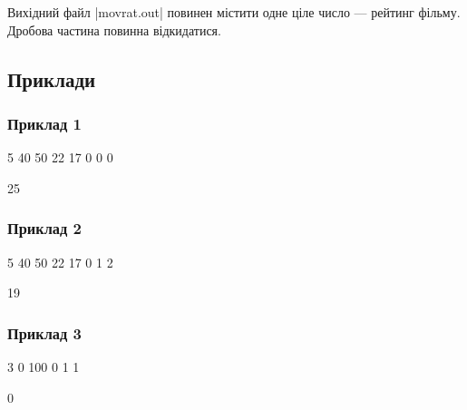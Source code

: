 \documentclass[12pt,a4paper]{article}
\begin{document}
Вихідний файл |movrat.out| повинен містити одне ціле число --- рейтинг фільму. Дробова частина повинна відкидатися.


\pagebreak


\subsection*{Приклади}

\subsubsection*{Приклад 1}

\textbf{}

\begin{codeblock}
5
40 50 22 17 0
0
0
\end{codeblock}

\textbf{}

\begin{codeblock}
25
\end{codeblock}


\subsubsection*{Приклад 2}

\textbf{}

\begin{codeblock}
5
40 50 22 17 0
1
2
\end{codeblock}

\textbf{}

\begin{codeblock}
19
\end{codeblock}


\subsubsection*{Приклад 3}

\textbf{}

\begin{codeblock}
3
0 100 0
1
1
\end{codeblock}

\textbf{}

\begin{codeblock}
0
\end{codeblock}
\end{document}
